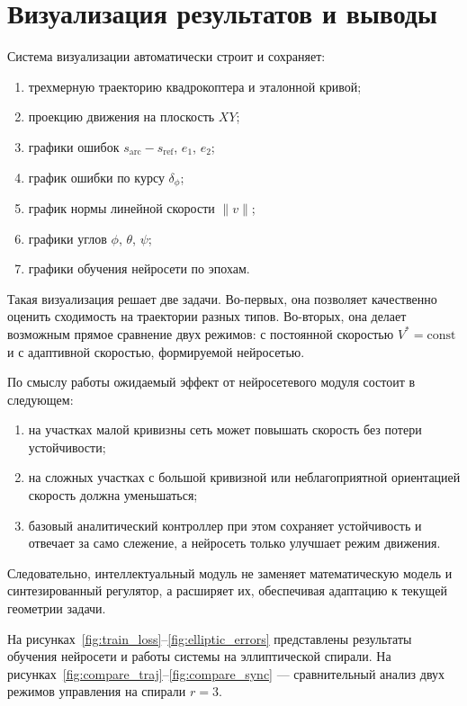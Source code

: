 \section{Визуализация результатов и выводы}

Система визуализации автоматически строит и сохраняет:
\begin{enumerate}
    \item трехмерную траекторию квадрокоптера и эталонной кривой;
    \item проекцию движения на плоскость $XY$;
    \item графики ошибок $s_{\mathrm{arc}} - s_{\mathrm{ref}}$, $e_1$, $e_2$;
    \item график ошибки по курсу $\delta_{\phi}$;
    \item график нормы линейной скорости $\|v\|$;
    \item графики углов $\phi$, $\theta$, $\psi$;
    \item графики обучения нейросети по эпохам.
\end{enumerate}

Такая визуализация решает две задачи. Во-первых, она позволяет качественно оценить сходимость на траектории разных типов. Во-вторых, она делает возможным прямое сравнение двух режимов: с постоянной скоростью $V^{\ast}=\mathrm{const}$ и с адаптивной скоростью, формируемой нейросетью.

По смыслу работы ожидаемый эффект от нейросетевого модуля состоит в следующем:
\begin{enumerate}
    \item на участках малой кривизны сеть может повышать скорость без потери устойчивости;
    \item на сложных участках с большой кривизной или неблагоприятной ориентацией скорость должна уменьшаться;
    \item базовый аналитический контроллер при этом сохраняет устойчивость и отвечает за само слежение, а нейросеть только улучшает режим движения.
\end{enumerate}

Следовательно, интеллектуальный модуль не заменяет математическую модель и синтезированный регулятор, а расширяет их, обеспечивая адаптацию к текущей геометрии задачи.

На рисунках~\ref{fig:train_loss}--\ref{fig:elliptic_errors} представлены результаты обучения нейросети и работы системы на эллиптической спирали. На рисунках~\ref{fig:compare_traj}--\ref{fig:compare_sync} — сравнительный анализ двух режимов управления на спирали $r{=}3$.

